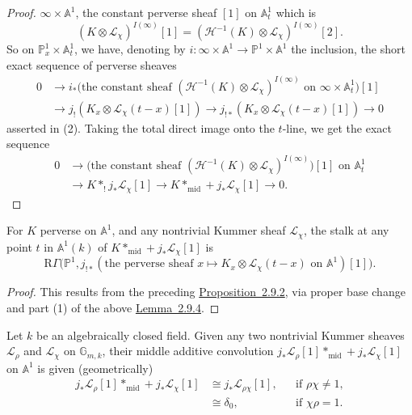 \begin{proof}
\(\infty\times\mathbb{A}^1\), the constant perverse sheaf \([1]\) on
\(\mathbb{A}^1_t\) which is
\[
  (K\otimes\mathcal{L}_\chi)^{I(\infty)}[1]
  =
  (\mathcal{H}^{-1}(K)\otimes\mathcal{L}_\chi)^{I(\infty)}[2].
\]
So on \(\mathbb{P}^1_x\times\mathbb{A}^1_t\), we have, denoting by
\(i:\infty\times\mathbb{A}^1\to\mathbb{P}^1\times\mathbb{A}^1\) the
inclusion, the short exact sequence of perverse sheaves
\[
  \begin{aligned}
    0 &\to
    i_*\bigl(\text{the constant sheaf }
    (\mathcal{H}^{-1}(K)\otimes\mathcal{L}_\chi)^{I(\infty)}
    \text{ on }\infty\times\mathbb{A}^1_t\bigr)[1]\\
    &\to j_!(K_x\otimes\mathcal{L}_\chi(t-x)[1])
    \to j_{!*}(K_x\otimes\mathcal{L}_\chi(t-x)[1])
    \to 0
  \end{aligned}
\]
asserted in (2). Taking the total direct image onto the \(t\)-line, we get the
exact sequence
\[
  \begin{aligned}
    0 &\to
    \bigl(\text{the constant sheaf }
    (\mathcal{H}^{-1}(K)\otimes\mathcal{L}_\chi)^{I(\infty)}\bigr)[1]
    \text{ on }\mathbb{A}^1_t\\
    &\to K*_!j_*\mathcal{L}_\chi[1]
    \to K*_{\mathrm{mid}}+j_*\mathcal{L}_\chi[1]
    \to 0.
  \end{aligned}
\]
\end{proof}

For \(K\) perverse on \(\mathbb{A}^1\), and any nontrivial Kummer sheaf
\(\mathcal{L}_\chi\), the stalk at any point \(t\) in \(\mathbb{A}^1(k)\) of
\(K*_{\mathrm{mid}}+j_*\mathcal{L}_\chi[1]\) is
\[
  \mathrm{R}\Gamma\bigl(\mathbb{P}^1,
  j_{!*}(\text{the perverse sheaf }
  x\mapsto K_x\otimes\mathcal{L}_\chi(t-x)
  \text{ on }\mathbb{A}^1)[1]\bigr).
\]

\begin{proof}
This results from the preceding \hyperref[prop:2.9.2]{Proposition~2.9.2}, via proper base change and
part (1) of the above \hyperref[lem:2.9.4]{Lemma~2.9.4}.
\end{proof}

Let \(k\) be an algebraically closed field. Given any two nontrivial Kummer
sheaves \(\mathcal{L}_\rho\) and \(\mathcal{L}_\chi\) on
\(\mathbb{G}_{m,k}\), their middle additive convolution
\(j_*\mathcal{L}_\rho[1]*_{\mathrm{mid}}+j_*\mathcal{L}_\chi[1]\) on
\(\mathbb{A}^1\) is given (geometrically)
\[
  \begin{aligned}
    j_*\mathcal{L}_\rho[1]*_{\mathrm{mid}}+j_*\mathcal{L}_\chi[1]
      &\cong j_*\mathcal{L}_{\rho\chi}[1],
      &&\text{if }\rho\chi\neq 1,\\
      &\cong \delta_0,
      &&\text{if }\chi\rho=1.
  \end{aligned}
\]

